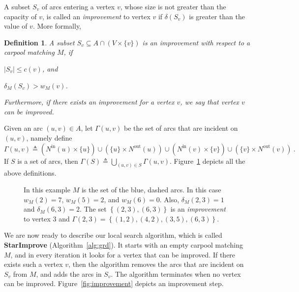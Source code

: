 \documentclass[11pt]{article}
\newtheorem{definition}{Definition}
\newcommand{\set}[1]{\left\{ #1 \right\}}
\newcommand{\abs}[1]{\left| #1 \right|}
\newcommand{\eqdf}{\triangleq}
\newcommand{\nin}[1][M]{N^{\text{in}}_{#1}}
\newcommand{\nout}[1][M]{N^{\text{out}}_{#1}}
\newcommand{\inc}{\Gamma}
\begin{document}
A subset $S_v$ of arcs entering a vertex $v$, whose size is not
greater than the capacity of $v$, is called an \emph{improvement} to
vertex $v$ if $\delta(S_v)$ is greater than the value of $v$.  More
formally, 

\begin{definition}
A subset $S_v \subseteq A \cap (V \times \{v\})$ is
an \emph{improvement} with respect to a carpool matching $M$, if
\begin{inparaenum}[(i)]
\item $\abs{S_v} \leq c(v)$, and
\item $\delta_M(S_v) > w_M(v)$.
\end{inparaenum}
Furthermore, if there exists an improvement for a vertex $v$, we say
that vertex $v$ can be \emph{improved}.
\end{definition}

Given an arc $(u,v) \in A$, let $\inc(u,v)$ be the set of arcs that
are incident on $(u,v)$, namely define
\[
\inc(u,v)
\eqdf (\nin[](u) \times \{u\}) \cup (\{u\} \times \nout[](u)) \cup
      (\nin[](v) \times \{v\}) \cup (\{v\} \times \nout[](v))
~.
\]
If $S$ is a set of arcs, then $\inc(S) \eqdf \bigcup_{(u,v) \in
S} \inc(u,v)$.
%
Figure~\ref{fig:defs} depicts all the above definitions.

\begin{figure}[t]
\centering
{}
\caption{In this example $M$ is the set of the blue, dashed arcs.
In this case $w_M(2) = 7$, $w_M(5) = 2$, and $w_M(6) = 0$.  Also,
$\delta_M(2, 3) = 1$ and $\delta_M(6, 3) = 2$.  The set $\set{(2,3),
(6,3)}$ is an \emph{improvement} to vertex 3 and $\inc(2,3)
= \set{(1,2),(4,2),(3,5),(6,3)}$.}
\label{fig:defs}
\end{figure}

We are now ready to describe our local search algorithm, which is
called \textbf{StarImprove} (Algorithm~\ref{alg:grd}).  It starts with
an empty carpool matching $M$, and in every iteration it looks for a
vertex that can be improved.  If there exists such a vertex $v$, then
the algorithm removes the arcs that are incident on $S_v$ from $M$,
and adds the arcs in $S_v$.  The algorithm terminates when no vertex
can be improved.  Figure~\ref{fig:improvement} depicts an improvement
step.
\end{document}
